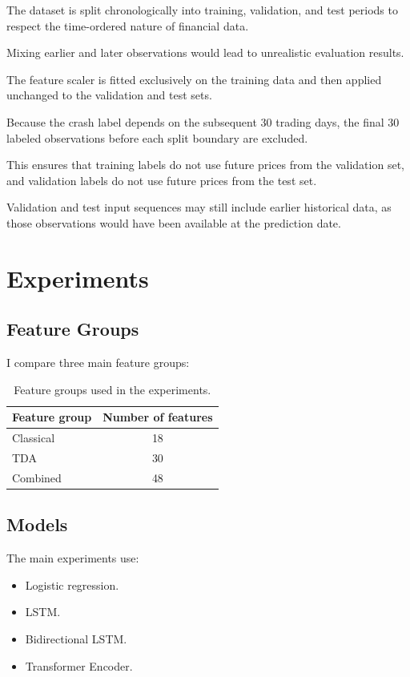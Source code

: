 \documentclass[oneside,english,11pt]{article}
\begin{document}
The dataset is split chronologically into training, validation, and test periods to respect the time-ordered nature of financial data.

Mixing earlier and later observations would lead to unrealistic evaluation results.

The feature scaler is fitted exclusively on the training data and then applied unchanged to the validation and test sets. 

Because the crash label depends on the subsequent 30 trading days, the final 30 labeled observations before each split boundary are excluded. 

This ensures that training labels do not use future prices from the validation set, and validation labels do not use future prices from the test set.

Validation and test input sequences may still include earlier historical data, as those observations would have been available at the prediction date.


\section{Experiments}
\label{sec:experiments}

\subsection{Feature Groups}

I compare three main feature groups:

\begin{table}[htbp]
\centering
\caption{Feature groups used in the experiments.}
\label{tab:features}

\begin{tabular}{lc}
\toprule
Feature group & Number of features\\
\midrule
Classical & 18\\
TDA & 30\\
Combined & 48\\
\bottomrule
\end{tabular}

\end{table}

\subsection{Models}

The main experiments use:

\begin{itemize}
\item Logistic regression.
\item LSTM.
\item Bidirectional LSTM.
\item Transformer Encoder.
\end{itemize}
\end{document}
